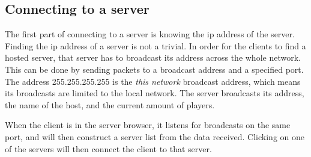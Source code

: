 \subsection{Connecting to a server}
The first part of connecting to a server is knowing the ip address of the server.
Finding the ip address of a server is not a trivial.
In order for the clients to find a hosted server, that server has to broadcast its address across the whole network.
This can be done by sending packets to a broadcast address and a specified port.
The address 255.255.255.255 is the \textit{this network} broadcast address, which means its broadcasts are limited to the local network.
The server broadcasts its address, the name of the host, and the current amount of players.

When the client is in the server browser, it listens for broadcasts on the same port, and will then construct a server list from the data received.
Clicking on one of the servers will then connect the client to that server.